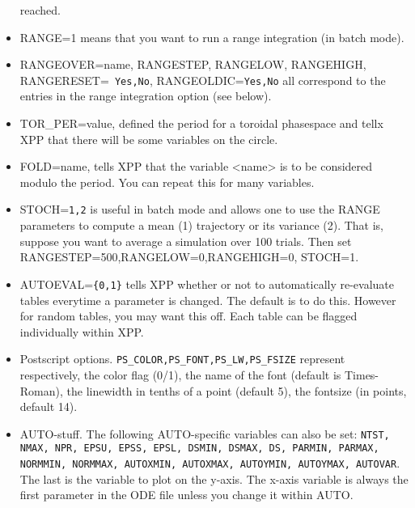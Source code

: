 \documentclass{article}
\begin{document}
\begin{itemize}
reached.
\item RANGE=1 means that you want to run a range integration (in batch
mode). 
\item RANGEOVER=name, RANGESTEP, RANGELOW, RANGEHIGH, RANGERESET={\tt
Yes,No}, RANGEOLDIC={\tt Yes,No} all correspond to the entries in the
range integration option (see below).
\item TOR\_PER=value, defined the period for a toroidal phasespace and
tellx XPP that there will be some variables on the circle.
\item FOLD=name, tells XPP that the variable <name> is to be
considered modulo the period.  You can repeat this for many variables.
\item STOCH={\tt 1,2} is useful in batch mode and allows one to use
the RANGE parameters to compute a mean (1) trajectory or its variance
(2).  That is, suppose you want to average a simulation over 100
trials.  Then set RANGESTEP=500,RANGELOW=0,RANGEHIGH=0, STOCH=1. 
\item AUTOEVAL={\tt \{0,1\}} tells XPP whether or not to automatically
re-evaluate tables everytime a parameter is changed. The default is 
to do this. However for random tables, you may want this off. Each
table can be flagged individually within XPP.
\item Postscript options. {\tt PS\_COLOR,PS\_FONT,PS\_LW,PS\_FSIZE}
represent respectively, the color flag (0/1), the name of the font
(default is Times-Roman), the linewidth in tenths of a point (default
5), the fontsize (in points, default 14). 
\item AUTO-stuff. The following AUTO-specific variables can also be
set: {\tt NTST, NMAX, NPR, EPSU, EPSS, EPSL, DSMIN, DSMAX, DS, PARMIN, PARMAX, NORMMIN,
NORMMAX, AUTOXMIN, AUTOXMAX, AUTOYMIN, AUTOYMAX, AUTOVAR}.  The last
is the variable to plot on the y-axis. The x-axis variable is always
the first parameter in the ODE file unless you change it within AUTO. 
\end{itemize}
\end{document}
